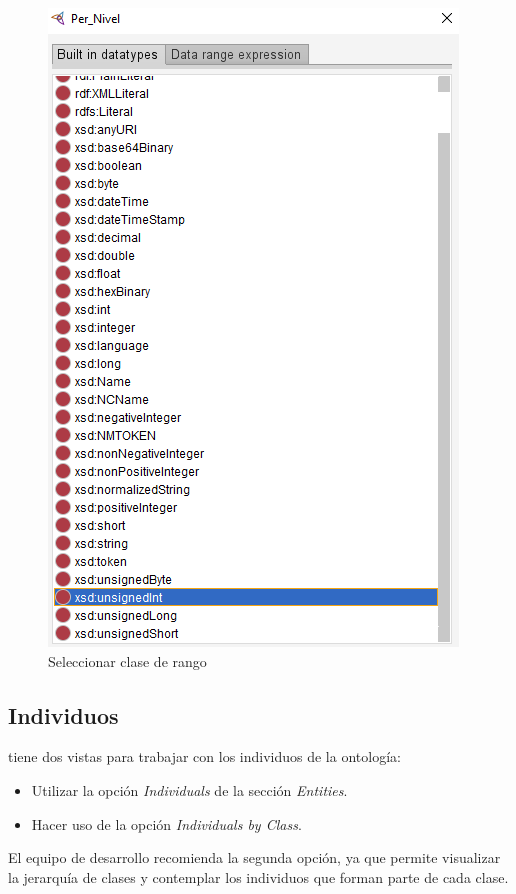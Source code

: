 \begin{enumerate}
    \begin{figure}[ht]
        \centering
        \includegraphics[scale=0.6]{Figures/Protege/CreateDataProp_6.png}
        \caption{Seleccionar clase de rango}
        \label{CreateDataProp_6}
    \end{figure}
\end{enumerate}

\subsection{Individuos}
\protege tiene dos vistas para trabajar con los individuos de la ontología:
\begin{itemize}
    \item Utilizar la opción \textit{Individuals} de la sección \textit{Entities}.
    \item Hacer uso de la opción \textit{Individuals by Class}.
\end{itemize}
El equipo de desarrollo recomienda la segunda opción, ya que permite visualizar la jerarquía de clases y 
contemplar los individuos que forman parte de cada clase.

